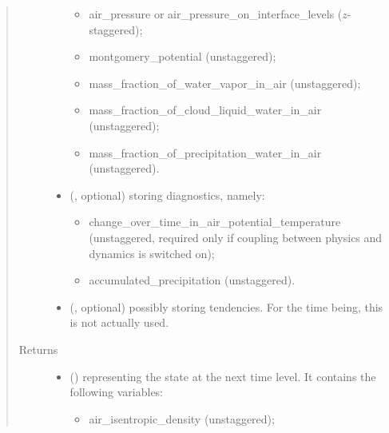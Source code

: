 \documentclass[letterpaper,10pt,english]{sphinxmanual}
\begin{document}
\begin{fulllineitems}
\begin{fulllineitems}
\begin{quote}
\begin{description}
\begin{itemize}
\begin{itemize}
\item {} 
air\_pressure or air\_pressure\_on\_interface\_levels (\(z\)-staggered);

\item {} 
montgomery\_potential (unstaggered);

\item {} 
mass\_fraction\_of\_water\_vapor\_in\_air (unstaggered);

\item {} 
mass\_fraction\_of\_cloud\_liquid\_water\_in\_air (unstaggered);

\item {} 
mass\_fraction\_of\_precipitation\_water\_in\_air (unstaggered).

\end{itemize}


\item {} 
 (, optional) \textendash{} 
{\hyperref[\detokenize{api:tasmania.storages.grid_data.GridData}]{}} storing diagnostics, namely:
\begin{itemize}
\item {} 
change\_over\_time\_in\_air\_potential\_temperature (unstaggered, required only if coupling                                 between physics and dynamics is switched on);

\item {} 
accumulated\_precipitation (unstaggered).

\end{itemize}


\item {} 
 (, optional) \textendash{} {\hyperref[\detokenize{api:tasmania.storages.grid_data.GridData}]{}} possibly storing tendencies.
For the time being, this is not actually used.

\end{itemize}

\item[{Returns}] \leavevmode
\begin{itemize}
\item {} 
 () \textendash{} {\hyperref[\detokenize{api:tasmania.storages.state_isentropic.StateIsentropic}]{}} representing the state at the next time level.
It contains the following variables:
\begin{itemize}
\item {} 
air\_isentropic\_density (unstaggered);


\end{itemize}
\end{itemize}
\end{description}
\end{quote}
\end{fulllineitems}
\end{fulllineitems}
\end{document}
